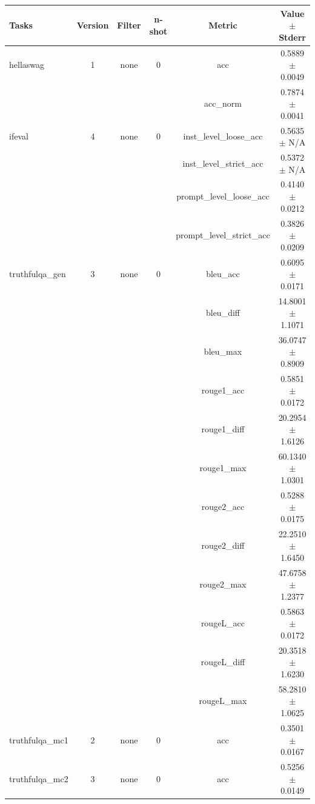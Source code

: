 \documentclass{ifacconf}
\begin{document}
\begin{strip}
\begin{minipage}{\textwidth}
			\begin{table}[H]
				\centering
				\begin{tabular}{|l|c|c|c|c|c|}
					\hline
					\textbf{Tasks} & \textbf{Version} & \textbf{Filter} & \textbf{n-shot} & \textbf{Metric} & \textbf{Value} $\pm$ \textbf{Stderr} \\ \hline
					hellaswag & 1 & none & 0 & acc & 0.5889 $\pm$ 0.0049 \\ \hline
					& & & & acc\_norm & 0.7874 $\pm$ 0.0041 \\ \hline
					ifeval & 4 & none & 0 & inst\_level\_loose\_acc & 0.5635 $\pm$ N/A \\ \hline
					& & & & inst\_level\_strict\_acc & 0.5372 $\pm$ N/A \\ \hline
					& & & & prompt\_level\_loose\_acc & 0.4140 $\pm$ 0.0212 \\ \hline
					& & & & prompt\_level\_strict\_acc & 0.3826 $\pm$ 0.0209 \\ \hline
					truthfulqa\_gen & 3 & none & 0 & bleu\_acc & 0.6095 $\pm$ 0.0171 \\ \hline
					& & & & bleu\_diff & 14.8001 $\pm$ 1.1071 \\ \hline
					& & & & bleu\_max & 36.0747 $\pm$ 0.8909 \\ \hline
					& & & & rouge1\_acc & 0.5851 $\pm$ 0.0172 \\ \hline
					& & & & rouge1\_diff & 20.2954 $\pm$ 1.6126 \\ \hline
					& & & & rouge1\_max & 60.1340 $\pm$ 1.0301 \\ \hline
					& & & & rouge2\_acc & 0.5288 $\pm$ 0.0175 \\ \hline
					& & & & rouge2\_diff & 22.2510 $\pm$ 1.6450 \\ \hline
					& & & & rouge2\_max & 47.6758 $\pm$ 1.2377 \\ \hline
					& & & & rougeL\_acc & 0.5863 $\pm$ 0.0172 \\ \hline
					& & & & rougeL\_diff & 20.3518 $\pm$ 1.6230 \\ \hline
					& & & & rougeL\_max & 58.2810 $\pm$ 1.0625 \\ \hline
					truthfulqa\_mc1 & 2 & none & 0 & acc & 0.3501 $\pm$ 0.0167 \\ \hline
					truthfulqa\_mc2 & 3 & none & 0 & acc & 0.5256 $\pm$ 0.0149 \\ \hline
				\end{tabular}
				\label{tab:llama31_q4km}
			\end{table}
			

\end{minipage}
\end{strip}
\end{document}
